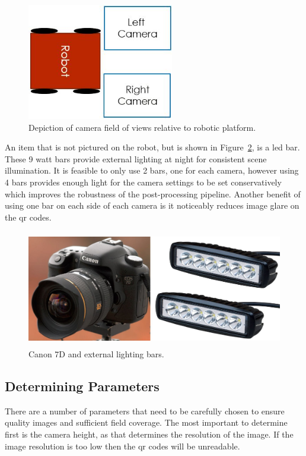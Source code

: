 \begin{figure}
	\centering
    \includegraphics[height=2in]{figures/camera_directions.jpg}
    \caption[Camera field of view]{Depiction of camera field of views relative to robotic platform.}
    \label{figure:image_fov}
\end{figure}

An item that is not pictured on the robot, but is shown in Figure~\ref{figure:canon_and_bars}, is a \ac{led} bar.  These 9 watt bars provide external lighting at night for consistent scene illumination.  It is feasible to only use 2 bars, one for each camera, however using 4 bars provides enough light for the camera settings to be set conservatively which improves the robustness of the post-processing pipeline.  Another benefit of using one bar on each side of each camera is it noticeably reduces image glare on the \ac{qr} codes.  

\begin{figure}
	\centering
    \includegraphics[height=2in]{figures/canon7d_and_LEDs.jpg}
    \caption[Canon 7D and LED bars]{Canon 7D and external lighting bars.}
    \label{figure:canon_and_bars}
\end{figure}

\subsection{Determining Parameters}
\label{section:determining_parameters}

There are a number of parameters that need to be carefully chosen to ensure quality images and sufficient field coverage.  The most important to determine first is the camera height, as that determines the resolution of the image.  If the image resolution is too low then the \ac{qr} codes will be unreadable.  

